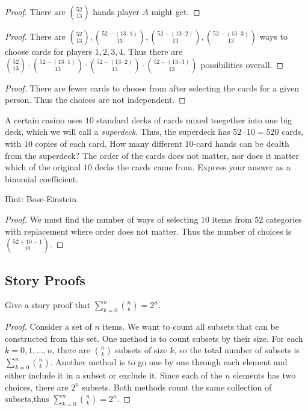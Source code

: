 \begin{proof}
    There are $\binom{52}{13}$ hands player $A$ might get.
\end{proof}

\begin{proof}
    There are $\binom{52}{13}, \binom{52 - (13 \cdot 1)}{13}, \binom {52 - (13 \cdot 2)}{13}, \binom{52 - (13 \cdot 3)}{13}$
        ways to choose cards for players $1, 2, 3, 4$.
    Thus there are  
        $\binom{52}{13} \cdot \binom{52 - (13 \cdot 1)}{13} \cdot \binom {52 - (13 \cdot 2)}{13} \cdot \binom{52 - (13 \cdot 3)}{13}$
        possibilities overall.
\end{proof}

\begin{proof}
    There are fewer cards to choose from after selecting the cards for a given person.
    Thus the choices are not independent.
\end{proof}

\begin{tcolorbox}[title=Problem 13, breakable]
    A certain casino uses $10$ standard decks of cards mixed toegether into one 
    big deck, which we will call a \emph{superdeck}. Thus, the superdeck has 
    $52 \cdot 10 = 520$ cards, with $10$ copies of each card. How many different 
    $10$-card hands can be dealth from the superdeck? The order of the cards does not matter,
    nor does it matter which of the original $10$ decks the cards came from. Express 
    your answer as a binomial coefficient.

    Hint: Bose-Einstein.
\end{tcolorbox}

\begin{proof}
    We must find the number of ways of selecting $10$ items from $52$ categories with replacement 
    where order does not matter.
    Thus the number of choices is $\binom{52 + 10 - 1}{10}$.
\end{proof}

\subsection{Story Proofs}

\begin{tcolorbox}[title=Problem 15, breakable]
    Give a story proof that $\sum_{k = 0}^{n} \binom{n}{k} = 2^n$.
\end{tcolorbox}

\begin{proof}
    Consider a set of $n$ items.
    We want to count all subsets that can be constructed from this set.
    One method is to count subsets by their size.
    For each $k = 0, 1, \ldots, n$, there are $\binom{n}{k}$ subsets of size $k$,
    so the total number of subsets is $\sum_{k=0}^{n} \binom{n}{k}$.
    Another method is to go one by one through each element and either include
    it in a subset or exclude it.
    Since each of the $n$ elements has two choices, there are $2^n$ subsets.
    Both methods count the same collection of subsets,thus
        $\sum_{k=0}^{n} \binom{n}{k} = 2^n$.
\end{proof}

